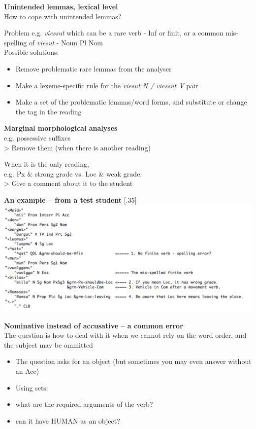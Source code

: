 \documentclass[landscape,norsk,11pt]{seminar}
\begin{document}
\begin{slide}
\newslide
\textbf{Unintended lemmas, lexical level} \\
How to cope with unintended lemmas?

Problem e.g. \textit{viessut} which can be a rare verb - Inf or finit,  or  a common mis-spelling of   \textit{viesut} - Noun Pl Nom  \\
Possible solutions:

\begin{itemize}
\item{Remove problematic rare lemmas from the analyser}
\item{Make a lexeme-specific rule for the \textit{viesut  N / viessut V } pair}
\item{Make a set of the problematic lemmas/word forms, and substitute or change the tag in the reading}
\end{itemize}


\newslide
\textbf{Marginal morphological analyses} \\
e.g. possessive suffixes \\
> Remove them (when there is another reading)

When it is the only reading, \\ e.g. Px \& strong grade vs. Loc \& weak grade: \\
> Give a comment about it to the student







\newslide
\textbf{An example -- from a test student}
\scalebox{.32}[.35]{\includegraphics{img/sentence_example.png}}

\newslide
\textbf{Nominative instead of accusative -- a common error} \\
The question is how to deal with it when we cannot rely on the word order, and the subject may be ommitted
\begin{itemize}
\item The question asks for an object (but sometimes you may even answer without an Acc)
\item Using sets:
\item what are the required arguments of the verb?
\item can it have HUMAN as an object? 
\end{itemize}


\end{slide}
\end{document}
